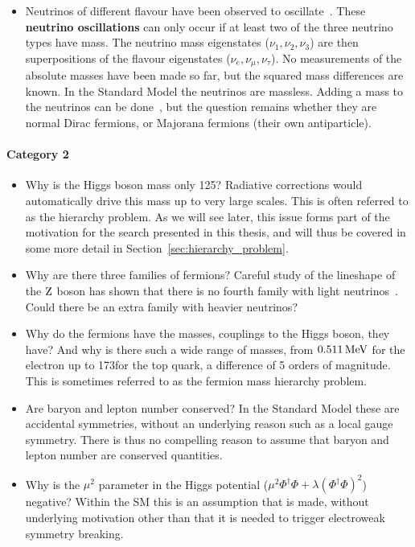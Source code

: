 \begin{itemize}
  \item Neutrinos of different flavour have been observed to
oscillate~\cite{Abe:2008aa,Abe:2014ugx,Agafonova:2014ptn}. These \textbf{neutrino oscillations} can
only occur if at least two of the three neutrino types have mass. The neutrino mass eigenstates
($\nu_1, \nu_2, \nu_3$) are then superpositions of the flavour eigenstates ($\nu_e, \nu_\mu,
\nu_\tau$).
No measurements of the absolute masses have been made so far, but the squared mass differences are
known. 
In the Standard Model the neutrinos are massless. Adding a mass to the neutrinos can be
done~\cite{Klinkhamer:2011aa}, but the question remains whether they are normal Dirac fermions, or
Majorana fermions (\ie their own antiparticle). 
\end{itemize}

\paragraph{Category 2}

\begin{itemize}
  \item Why is the Higgs boson mass only 125\GeV? Radiative corrections would automatically drive
this mass up to very large scales. This is often referred to as the hierarchy problem.
As we will see later, this issue forms part of the motivation for the search presented in this
thesis, and will thus be covered in some more detail in Section~\ref{sec:hierarchy_problem}. 

  \item Why are there three families of fermions? Careful study of the lineshape of the $\mathrm{Z}$
boson has shown that there is no fourth family with light neutrinos~\cite{Decamp:1989fr}. Could
there be an extra family with heavier neutrinos?

  \item Why do the fermions have the masses, \ie couplings to the Higgs boson, they have? And why
is there such a wide range of masses, \ie from $0.511\,\text{Me\hspace{-.08em}V}$ for the electron up to 173\GeV for the
top quark, a difference of 5 orders of magnitude. This is sometimes referred to as the fermion mass
hierarchy problem. 

  \item Are baryon and lepton number conserved? In the Standard Model these are accidental
symmetries, without an underlying reason such as a local gauge symmetry. There is thus no
compelling reason to assume that baryon and lepton number are conserved quantities. 
  
  \item Why is the $\mu^2$ parameter in the Higgs potential ($\mu^2 \Phi^\dagger \Phi + \lambda
(\Phi^\dagger \Phi)^2$) negative? Within the SM this is an assumption that is made, without
underlying motivation other than that it is needed to trigger electroweak symmetry breaking.
\end{itemize}


